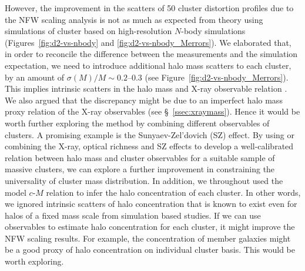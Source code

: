 \documentclass[iop, apj]{emulateapj}
\newcommand{\?}{\stackrel{?}{=}}
\begin{document}
However, the improvement in the scatters of 50 cluster distortion
profiles due to the NFW scaling analysis is not as much as expected from
theory using simulations of cluster based on high-resolution $N$-body
simulations (Figures~\ref{fig:d2-vs-nbody} and
\ref{fig:d2-vs-nbody_Merrors}). We elaborated that, in order to
reconcile the difference between the measurements and the simulation
expectation, we need to introduce additional halo mass scatters to each
cluster, by an amount of $\sigma(M)/M\sim 0.2$--$0.3$ (see
Figure~\ref{fig:d2-vs-nbody_Merrors}). This implies intrinsic scatters
in the halo mass and X-ray observable relation \citep{Okabeetal:10b}.
We also argued that the discrepancy might be due to an imperfect halo
mass proxy relation of the X-ray observables (see
\S~\ref{ssec:xraymass}). Hence it would be worth further exploring the
method by combining different observables of clusters. A promising
example is the Sunyaev-Zel'dovich (SZ) effect. By using or combining the
X-ray, optical richness and SZ effects to develop a well-calibrated
relation between halo mass and cluster observables for a suitable sample
of massive clusters, we can explore a further improvement in
constraining the universality of cluster mass distribution. In addition,
we throughout used the model $c$-$M$ relation to infer the halo
concentration of each cluster. In other words, we ignored intrinsic
scatters of halo concentration that is known to exist even for halos of
a fixed mass scale from simulation based studies. If we can use
observables to estimate halo concentration for each cluster, it might
improve the NFW scaling results. For example, the concentration of
member galaxies might be a good proxy of halo concentration on
individual cluster basis. This would be worth exploring.
\end{document}
